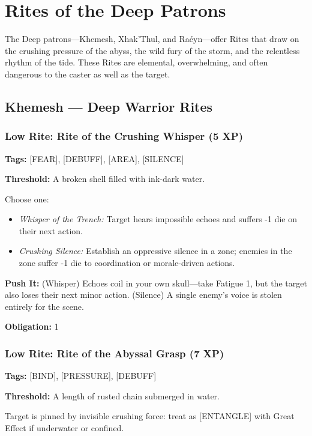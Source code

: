 \section{Rites of the Deep Patrons}

The Deep patrons—Khemesh, Xhak'Thul, and Raéyn—offer Rites that draw on the crushing pressure of the abyss, the wild fury of the storm, and the relentless rhythm of the tide. These Rites are elemental, overwhelming, and often dangerous to the caster as well as the target.

\subsection{Khemesh — Deep Warrior Rites}

\subsubsection{Low Rite: Rite of the Crushing Whisper (5 XP)}

\textbf{Tags:} [FEAR], [DEBUFF], [AREA], [SILENCE]

\textbf{Threshold:} A broken shell filled with ink-dark water.

Choose one:
\begin{itemize}
\item \textit{Whisper of the Trench:} Target hears impossible echoes and suffers -1 die on their next action.
\item \textit{Crushing Silence:} Establish an oppressive silence in a zone; enemies in the zone suffer -1 die to coordination or morale-driven actions.
\end{itemize}

\textbf{Push It:} (Whisper) Echoes coil in your own skull—take Fatigue 1, but the target also loses their next minor action. (Silence) A single enemy's voice is stolen entirely for the scene.

\textbf{Obligation:} 1

\subsubsection{Low Rite: Rite of the Abyssal Grasp (7 XP)}

\textbf{Tags:} [BIND], [PRESSURE], [DEBUFF]

\textbf{Threshold:} A length of rusted chain submerged in water.

Target is pinned by invisible crushing force: treat as [ENTANGLE] with Great Effect if underwater or confined.

